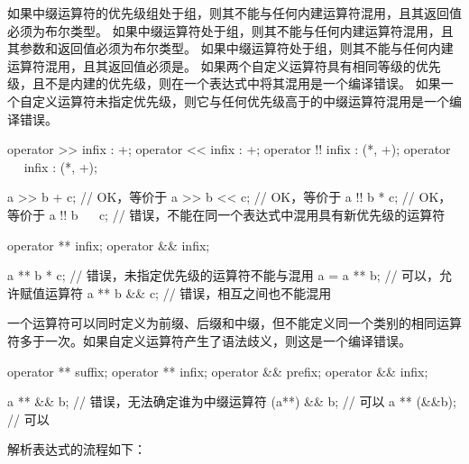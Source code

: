 \pnum
如果中缀运算符的优先级组处于\tcode{==}组，则其不能与任何内建运算符混用，且其返回值必须为布尔类型。
如果中缀运算符处于\tcode{\&}组，则其不能与任何内建运算符混用，且其参数和返回值必须为布尔类型。
如果中缀运算符处于\tcode{=}组，则其不能与任何内建运算符混用，且其返回值必须是。
如果两个自定义运算符具有相同等级的优先级，且不是内建的优先级，则在一个表达式中将其混用是一个编译错误。
如果一个自定义运算符未指定优先级，则它与任何优先级高于\tcode{==}的中缀运算符混用是一个编译错误。

\enterexample
\begin{codeblock}
operator >> infix : +;
operator << infix : +;
operator !! infix : (*, +);
operator ~~ infix : (*, +);

a >> b + c; // OK，等价于
a >> b << c; // OK，等价于
a !! b * c; // OK，等价于
a !! b ~~ c; // 错误，不能在同一个表达式中混用具有新优先级的运算符

operator ** infix;
operator && infix;

a ** b * c; // 错误，未指定优先级的运算符不能与\tcode{*}混用
a = a ** b; // 可以，允许赋值运算符
a ** b && c; // 错误，相互之间也不能混用
\end{codeblock}
\exitexample

\pnum
一个运算符可以同时定义为前缀、后缀和中缀，但不能定义同一个类别的相同运算符多于一次。如果自定义运算符产生了语法歧义，则这是一个编译错误。

\enterexample
\begin{codeblock}
operator ** suffix;
operator ** infix;
operator && prefix;
operator && infix;

a ** && b; // 错误，无法确定谁为中缀运算符
(a**) && b; // 可以
a ** (&&b); // 可以
\end{codeblock}
\exitexample

\pnum
解析表达式的流程如下：

